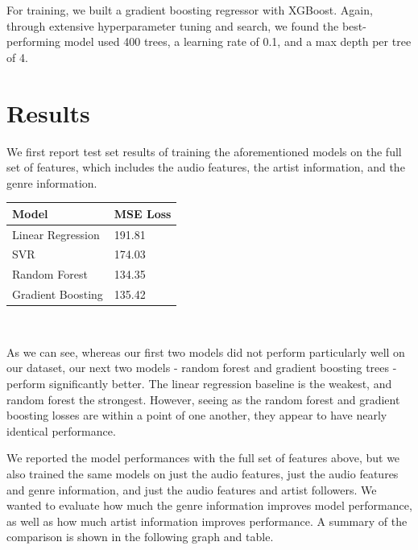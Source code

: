 \documentclass[journal]{IEEEtran}
\begin{document}
For training, we built a gradient boosting regressor with XGBoost. Again, through extensive hyperparameter tuning and search, we found the best-performing model used 400 trees, a learning rate of 0.1, and a max depth per tree of 4. \\

\section{Results}

We first report test set results of training the aforementioned models on the full set of features, which includes the audio features, the artist information, and the genre information. \\

\begin{center}
\begin{tabular}{|l|l|}
\hline
\textbf{Model} & \textbf{MSE Loss} \\ \hline
Linear Regression  & 191.81                 \\ \hline
SVR                & 174.03                 \\ \hline
Random Forest      & 134.35                 \\ \hline
Gradient Boosting  & 135.42                  \\ \hline
\end{tabular} \\
\end{center}

\quad\newline
As we can see, whereas our first two models did not perform particularly well on our dataset, our next two models - random forest and gradient boosting trees - perform significantly better. The linear regression baseline is the weakest, and random forest the strongest. However, seeing as the random forest and gradient boosting losses are within a point of one another, they appear to have nearly identical performance.

We reported the model performances with the full set of features above, but we also trained the same models on just the audio features, just the audio features and genre information, and just the audio features and artist followers. We wanted to evaluate how much the genre information improves model performance, as well as how much artist information improves performance. A summary of the comparison is shown in the following graph and table.
\end{document}
